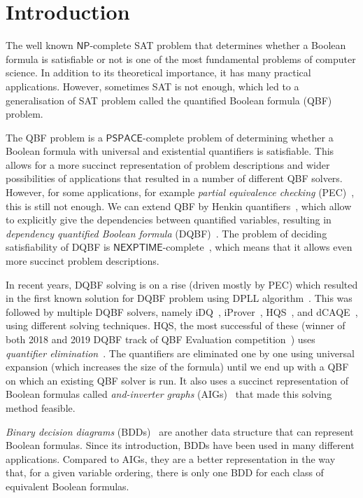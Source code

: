 \documentclass[
  digital, %
  color,
  twoside, %
  table,   %
  nolof,     %
  nolot,     %
]{fithesis3}
\theoremstyle{definition}
\theoremstyle{remark}
\newcommand{\ComplexityFont}[1]{\mathsf{#1}}
\newcommand{\PSPACE}{\ComplexityFont{PSPACE}}
\newcommand{\NP}{\ComplexityFont{NP}}
\newcommand{\NEXPTIME}{\ComplexityFont{NEXPTIME}}
\begin{document}
\chapter{Introduction}
The well known $\NP$-complete SAT problem that determines whether a Boolean formula is satisfiable or not is one of the most fundamental problems of computer science. In addition to its theoretical importance, it has many practical applications. However, sometimes SAT is not enough, which led to a generalisation of SAT problem called the quantified Boolean formula (QBF) problem. %

The QBF problem is a $\PSPACE$-complete problem of determining whether a Boolean formula with universal and existential quantifiers is satisfiable. This allows for a more succinct representation of problem descriptions and wider possibilities of applications that resulted in a number of different QBF solvers. However, for some applications, for example \emph{partial equivalence checking} (PEC)~\cite{HQSsimpleAlg}, this is still not enough. We can extend QBF by Henkin quantifiers~\cite{HenkinQuant}, which allow to explicitly give the dependencies between quantified variables, resulting in \emph{dependency quantified Boolean formula} (DQBF)~\cite{NegationOfDQBFs}. The problem of deciding satisfiability of DQBF is $\NEXPTIME$-complete~\cite{DQBFisNEXPTIME}, which means that it allows even more succinct problem descriptions.

In recent years, DQBF solving is on a rise (driven mostly by PEC) which resulted in the first known solution for DQBF problem using DPLL algorithm~\cite{DPLLalgorithm}. This was followed by multiple DQBF solvers, namely iDQ~\cite{iDQandDQDIMACS}, iProver~\cite{iProver}, HQS~\cite{HQSquantifierElimination,HQSdependencyElimination,HQSquantifierLocalisation}, and dCAQE~\cite{dCAQE}, using different solving techniques. HQS, the most successful of these (winner of both 2018 and 2019 DQBF track of QBF Evaluation competition~\cite{QBFeval18,QBFeval19}) uses \emph{quantifier elimination}~\cite{HQSquantifierElimination}. The quantifiers are eliminated one by one using universal expansion (which increases the size of the formula) until we end up with a QBF on which an existing QBF solver is run. It also uses a succinct representation of Boolean formulas called \emph{and-inverter graphs} (AIGs)~\cite{FRAIGs} that made this solving method feasible.

\emph{Binary decision diagrams} (BDDs)~\cite{BDD} are another data structure that can represent Boolean formulas. Since its introduction, BDDs have been used in many different applications. Compared to AIGs, they are a better representation in the way that, for a given variable ordering, there is only one BDD for each class of equivalent Boolean formulas.
\end{document}
